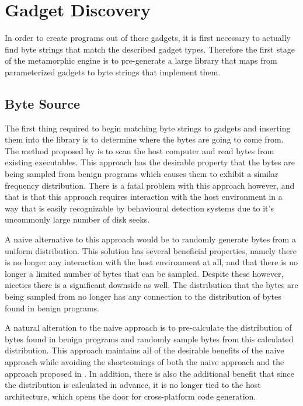     \section{Gadget Discovery}

    In order to create programs out of these gadgets, it is first necessary to
    actually find byte strings that match the described gadget types. Therefore
    the first stage of the metamorphic engine is to pre-generate a large library
    that maps from parameterized gadgets to byte strings that implement them.

    \subsection{Byte Source}

    The first thing required to begin matching byte strings to gadgets and
    inserting them into the library is to determine where the bytes are going to
    come from. The method proposed by \cite{franken} is to scan the host
    computer and read bytes from existing executables. This approach has the
    desirable property that the bytes are being sampled from benign programs
    which causes them to exhibit a similar frequency distribution.  There is a
    fatal problem with this approach however, and that is that this approach
    requires interaction with the host environment in a way that is easily
    recognizable by behavioural detection systems due to it's uncommonly large
    number of disk seeks.


    A naive alternative to this approach would be to randomly generate bytes
    from a uniform distribution. This solution has several beneficial
    properties, namely there is no longer any interaction with the host
    environment at all, and that there is no longer a limited number of bytes
    that can be sampled. Despite these however, niceties there is a significant
    downside as well. The distribution that the bytes are being sampled from no
    longer has any connection to the distribution of bytes found in benign
    programs.

    A natural alteration to the naive approach is to pre-calculate the
    distribution of bytes found in benign programs and randomly sample bytes
    from this calculated distribution. This approach maintains all of the
    desirable benefits of the naive approach while avoiding the shortcomings of
    both the naive approach and the approach proposed in \cite{franken}. In
    addition, there is also the additional benefit that since the distribution
    is calculated in advance, it is no longer tied to the host architecture,
    which opens the door for cross-platform code generation.

